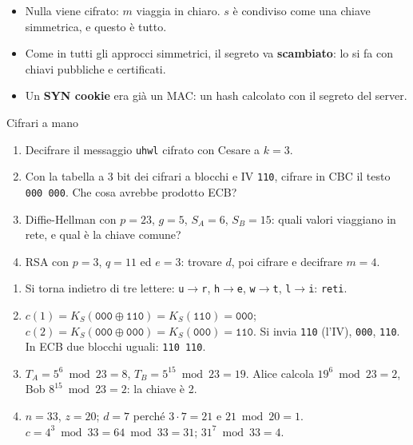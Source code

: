 \begin{itemize}
    \item Nulla viene cifrato: $m$ viaggia in chiaro. $s$ è condiviso come una chiave simmetrica, e questo è tutto.
    \item Come in tutti gli approcci simmetrici, il segreto va \textbf{scambiato}: lo si fa con chiavi pubbliche e certificati.
    \item Un \textbf{SYN cookie} era già un MAC: un hash calcolato con il segreto del server.
\end{itemize}

\begin{esercizio}{Cifrari a mano}
\begin{enumerate}[label=(\alph*)]
    \item Decifrare il messaggio \texttt{uhwl} cifrato con Cesare a $k = 3$.
    \item Con la tabella a 3 bit dei cifrari a blocchi e IV \texttt{110}, cifrare in CBC il testo \texttt{000 000}. Che cosa avrebbe
          prodotto ECB?
    \item Diffie-Hellman con $p = 23$, $g = 5$, $S_A = 6$, $S_B = 15$: quali valori viaggiano in rete, e qual è la chiave comune?
    \item RSA con $p = 3$, $q = 11$ ed $e = 3$: trovare $d$, poi cifrare e decifrare $m = 4$.
\end{enumerate}

\svolgimento
\begin{enumerate}[label=(\alph*)]
    \item Si torna indietro di tre lettere: \texttt{u}$\rightarrow$\texttt{r}, \texttt{h}$\rightarrow$\texttt{e},
          \texttt{w}$\rightarrow$\texttt{t}, \texttt{l}$\rightarrow$\texttt{i}: \texttt{reti}.
    \item $c(1) = K_S(\texttt{000} \oplus \texttt{110}) = K_S(\texttt{110}) = \texttt{000}$; $c(2) = K_S(\texttt{000} \oplus
          \texttt{000}) = K_S(\texttt{000}) = \texttt{110}$. Si invia \texttt{110} (l'IV), \texttt{000}, \texttt{110}. In ECB due blocchi
          uguali: \texttt{110 110}.
    \item $T_A = 5^6 \bmod 23 = 8$, $T_B = 5^{15} \bmod 23 = 19$. Alice calcola $19^6 \bmod 23 = 2$, Bob $8^{15} \bmod 23 = 2$: la chiave
          è 2.
    \item $n = 33$, $z = 20$; $d = 7$ perché $3 \cdot 7 = 21$ e $21 \bmod 20 = 1$. $c = 4^3 \bmod 33 = 64 \bmod 33 = 31$;
          $31^7 \bmod 33 = 4$.
\end{enumerate}
\end{esercizio}

